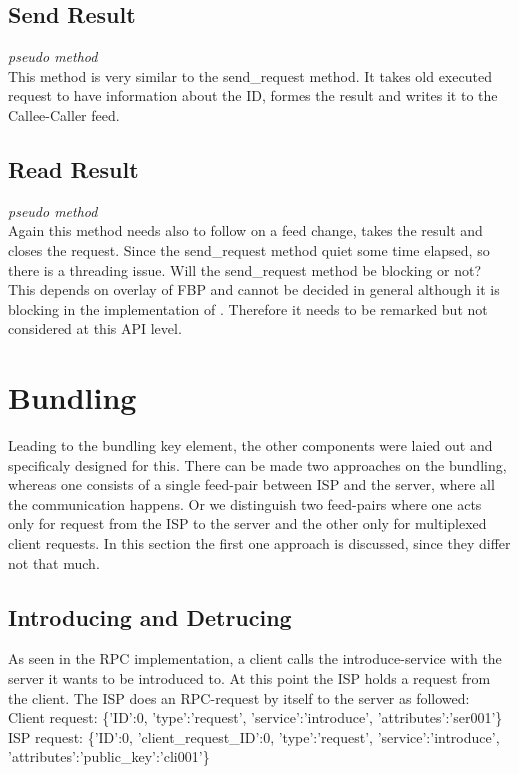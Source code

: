 \subsection{Send Result}
\textit{pseudo method}\\
This method is very similar to the send\_request method. It takes old executed request to have information about the ID, formes the result and writes it to the Callee-Caller feed.
\subsection{Read Result}
\textit{pseudo method}\\
Again this method needs also to follow on a feed change, takes the result and closes the request. Since the send\_request method quiet some time elapsed, so there is a threading issue. Will the send\_request method be blocking or not? This depends on overlay of FBP and cannot be decided in general although it is blocking in the implementation of \citet{birrell1984implementing}. Therefore it needs to be remarked but not considered at this API level.

\section{Bundling}
Leading to the bundling key element, the other components were laied out and specificaly designed for this. There can be made two approaches on the bundling, whereas one consists of a single feed-pair between ISP and the server, where all the communication happens. Or we distinguish two feed-pairs where one acts only for request from the ISP to the server and the other only for multiplexed client requests. In this section the first one approach is discussed, since they differ not that much.
\subsection{Introducing and Detrucing}
As seen in the RPC implementation, a client calls the introduce-service with the server it wants to be introduced to. At this point the ISP holds a request from the client. The ISP does an RPC-request by itself to the server as followed:
\\
Client request: \{'ID':0, 'type':'request', 'service':'introduce', 'attributes':'ser001'\}\\
ISP request: \{'ID':0, 'client\_request\_ID':0, 'type':'request', 'service':'introduce', 'attributes':{'public\_key':'cli001'}\}\\

